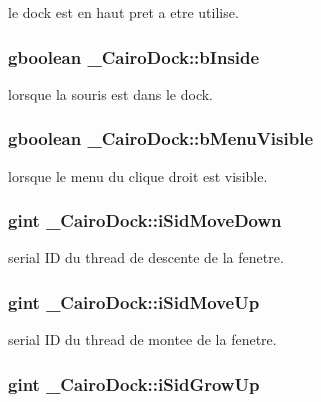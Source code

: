 le dock est en haut pret a etre utilise. 

\subsubsection{\setlength{\rightskip}{0pt plus 5cm}gboolean {\bf \_\-CairoDock::bInside}}\label{struct__CairoDock_e177aed10f2cd552c075f39865961fd3}


lorsque la souris est dans le dock. 

\subsubsection{\setlength{\rightskip}{0pt plus 5cm}gboolean {\bf \_\-CairoDock::bMenuVisible}}\label{struct__CairoDock_5c0b8267beb8afd377f56d134df50a26}


lorsque le menu du clique droit est visible. 

\subsubsection{\setlength{\rightskip}{0pt plus 5cm}gint {\bf \_\-CairoDock::iSidMoveDown}}\label{struct__CairoDock_b873dfdfa1a1b7503d6f6a9cd720f5c8}


serial ID du thread de descente de la fenetre. 

\subsubsection{\setlength{\rightskip}{0pt plus 5cm}gint {\bf \_\-CairoDock::iSidMoveUp}}\label{struct__CairoDock_c0126219b7bc08457b720a942a4591bc}


serial ID du thread de montee de la fenetre. 

\subsubsection{\setlength{\rightskip}{0pt plus 5cm}gint {\bf \_\-CairoDock::iSidGrowUp}}\label{struct__CairoDock_8bd5c9c83a354366f9736759634c11f8}


